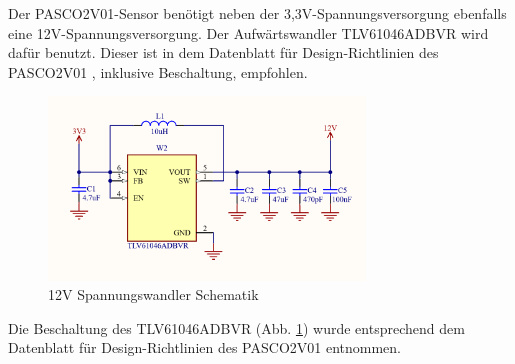 \begin{inhalt}
Der PASCO2V01-Sensor benötigt neben der 3,3V-Spannungsversorgung ebenfalls eine 12V-Spannungsversorgung. Der Aufwärtswandler TLV61046ADBVR \cite{TLV61046} wird dafür benutzt. Dieser ist in dem Datenblatt für Design-Richtlinien des PASCO2V01 \cite{PASCO2_Design_Guidelines}, inklusive Beschaltung, empfohlen.


\begin{figure}[!htb]
\centering
\includegraphics[width=0.75\textwidth]{files/Tobias/pics/Schaltungen/Schematik/12V_Converter_Schematik.PNG}
\caption[12V Spannungswandler Schematik]{12V Spannungswandler Schematik}
\label{fig:12V Spannungswandler Schematik}
\end{figure}

Die Beschaltung des TLV61046ADBVR (Abb. \ref{fig:12V Spannungswandler Schematik}) wurde entsprechend dem Datenblatt für Design-Richtlinien des PASCO2V01 \cite{PASCO2_Design_Guidelines} entnommen. 


\begin{figure}[H] 
  \centering


\end{figure}
\end{inhalt}
